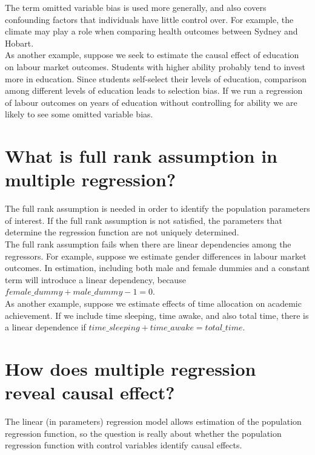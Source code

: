 \documentclass[%
 aip,
 jmp,%
 amsmath,amssymb,
 reprint,%
]{revtex4-1}
\begin{document}
The term omitted variable bias is used more generally, and also covers confounding factors
that individuals have little control over. For example, the climate may play a role when comparing
health outcomes between Sydney and Hobart. \\

As another example, suppose we seek to estimate the causal effect of education on labour
market outcomes. Students with higher ability probably tend to invest more in education.
Since students self-select their levels of education, comparison among different levels of education
leads to selection bias. If we run a regression of labour outcomes on years of education
without controlling for ability we are likely to see some omitted variable bias.\\


\section*{What is full rank assumption in multiple regression?}

The full rank assumption is needed in order to identify the population
parameters of interest. If the full rank assumption is not satisfied, the parameters that determine
the regression function are not uniquely determined.\\

The full rank assumption fails when there are linear dependencies among the regressors. For
example, suppose we estimate gender differences in labour market outcomes. In estimation,
including both male and female dummies and a constant term will introduce a linear dependency,
because $female\_dummy + male\_dummy - 1 = 0$.\\

As another example, suppose we estimate effects of time allocation on academic achievement.
If we include time sleeping, time awake, and also total time, there is a linear dependence
if $time\_sleeping + time\_awake = total\_time$.\\

\section*{How does multiple regression reveal causal effect?}

The linear (in parameters) regression model allows estimation of the
population regression function, so the question is really about whether the population regression
function with control variables identify causal effects.\\
\end{document}
